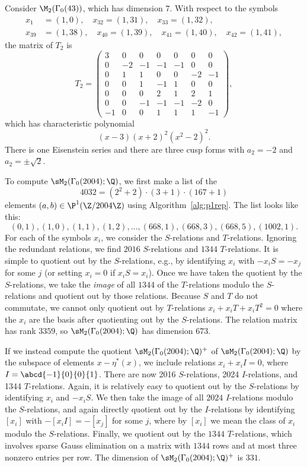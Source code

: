 \begin{example}
Consider $\M_2(\Gamma_0(43))$, which has dimension $7$.  
With respect to the symbols 
\begin{align*}
x_1&=(1,0),\quad x_{32}=(1,31),\quad
 x_{33} = (1,32),\\ 
x_{39} &= (1,38),\quad
 x_{40} = (1,39), \quad
x_{41} = (1,40),\quad
  x_{42} = (1,41),
\end{align*}
the matrix of $T_2$ is
$$
T_2=\left(\begin{array}{ccccccc}
3&0&0&0&0&0&0\\
0&-2&-1&-1&-1&0&0\\
0&1&1&0&0&-2&-1\\
0&0&1&-1&1&0&0\\
0&0&0&2&1&2&1\\
0&0&-1&-1&-1&-2&0\\
-1&0&0&1&1&1&-1
\end{array}\right),
$$
which has characteristic polynomial
$$
  (x-3)(x+2)^2 (x^2-2)^2.
$$
There is one Eisenstein series and there are three cusp forms
with $a_2 = -2$ and $a_2 = \pm \sqrt{2}$.
\end{example}

\begin{example}
To compute
$\sM_2(\Gamma_0(2004);\Q)$, we first make
a list of the 
$$
4032 = (2^2 + 2) \cdot (3+1) \cdot (167 + 1)
$$
elements $(a,b)\in\P^1(\Z/2004\Z)$ using Algorithm~\ref{alg:p1rep}.
The list looks like this:
$$
  (0, 1), (1, 0), (1, 1), (1, 2),
  \ldots,   (668, 1), (668, 3), (668, 5), (1002, 1).
$$
For each of the symbols $x_i$, we consider the $S$-relations
and $T$-relations.
Ignoring the redundant relations, we find $2016$ $S$-relations and
$1344$ $T$-relations.  It is simple to quotient out by the
$S$-relations, e.g., by identifying $x_i$ with $-x_i S = -x_j$ for
some $j$ (or setting $x_i=0$ if $x_i S = x_i$).  Once we have taken
the quotient by the $S$-relations, we take the {\em image} of all
$1344$ of the $T$-relations modulo the $S$-relations and quotient out by
those relations.  Because $S$ and $T$ do not commutate, we cannot
only quotient out by $T$-relations $x_i + x_i T + x_i T^2 = 0$ where
the $x_i$ are the basis after quotienting out by the $S$-relations.
The relation matrix has rank $3359$, so $\sM_2(\Gamma_0(2004);\Q)$ has
dimension $673$.

If we instead compute the quotient $\sM_2(\Gamma_0(2004);\Q)^+$
of $\sM_2(\Gamma_0(2004);\Q)$ by the subspace of elements $x-\eta^*(x)$,
we include relations $x_i+x_iI=0$, where $I=\abcd{-1}{0}{0}{1}$.
There are now 2016 $S$-relations, 2024 $I$-relations,
and 1344 $T$-relations.  Again, it is relatively easy to quotient
out by the $S$-relations by identifying $x_i$ and $-x_i S$.
We then take the image of all $2024$ $I$-relations modulo the
$S$-relations, and again directly quotient out by the $I$-relations
by identifying $[x_i]$ with $-[x_iI]=-[x_j]$ for some $j$, where
by $[x_i]$ we mean the class of $x_i$ modulo the $S$-relations.
Finally, we quotient out by the $1344$ $T$-relations, which involves
sparse Gauss elimination on a matrix with $1344$ rows
and at most three nonzero entries per row.    
The dimension of $\sM_2(\Gamma_0(2004);\Q)^+$ is $331$.
\end{example}

